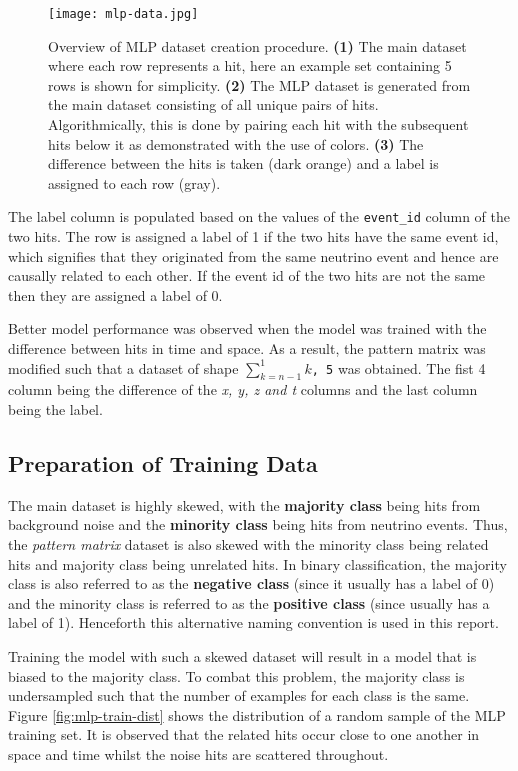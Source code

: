 \begin{figure}[t]
  \centering
  \texttt{[image: mlp-data.jpg]}
  \caption{Overview of MLP dataset creation procedure. \textbf{(1)}
    The main dataset where each row represents a hit, here an example
    set containing 5 rows is shown for simplicity. \textbf{(2)} The
    MLP dataset is generated from the main dataset consisting of all
    unique pairs of hits. Algorithmically, this is done by pairing
    each hit with the subsequent hits below it as demonstrated with
    the use of colors. \textbf{(3)} The difference between the hits is
    taken (dark orange) and a label is assigned to each row (gray).}
  \label{fig:mlp-data}
\end{figure}

The label column is populated based on the values of the
\texttt{event\_id} column of the two hits. The row is assigned a label
of 1 if the two hits have the same event id, which signifies that they
originated from the same neutrino event and hence are causally related
to each other. If the event id of the two hits are not the same then
they are assigned a label of 0.

Better model performance was observed when the model was trained with
the difference between hits in time and space. As a result, the
pattern matrix was modified such that a dataset of shape
\texttt{$\sum_{k=n-1}^{1}k$, 5} was obtained. The fist 4 column being the
difference of the \emph{x, y, z and t} columns and the last column
being the label.

\subsection{Preparation of Training Data}
\label{sec:mlp-data-prep-train}

The main dataset is highly skewed, with the \textbf{majority class}
being hits from background noise and the \textbf{minority class} being
hits from neutrino events. Thus, the \textit{pattern matrix} dataset
is also skewed with the minority class being related hits and majority
class being unrelated hits. In binary classification, the majority
class is also referred to as the \textbf{negative class} (since it
usually has a label of 0) and the minority class is referred to as the
\textbf{positive class} (since usually has a label of 1). Henceforth
this alternative naming convention is used in this report.

Training the model with such a skewed dataset will result in a model
that is biased to the majority class. To combat this problem, the
majority class is undersampled \cite{CITEME} such that the number of
examples for each class is the same. Figure \ref{fig:mlp-train-dist}
shows the distribution of a random sample of the MLP training set. It
is observed that the related hits occur close to one another in space
 and time whilst the noise hits are scattered throughout.

